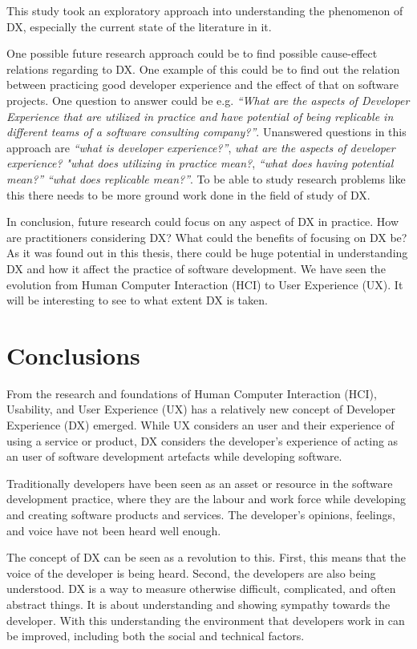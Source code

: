 \documentclass[english, 12pt, a4paper, sci, utf8, a-1b, online]{aaltothesis}
\begin{document}
This study took an exploratory approach into understanding the phenomenon of DX, especially the current state of the literature in it.

One possible future research approach could be to find possible cause-effect relations regarding to DX. One example of this could be to find out the relation between practicing good developer experience and the effect of that on software projects. One question to answer could be e.g. \textit{``What are the aspects of Developer Experience that are utilized in practice and have potential of being replicable in different teams of a software consulting company?''}. Unanswered questions in this approach are \textit{``what is developer experience?''}, \textit{what are the aspects of developer experience?} \textit{"what does utilizing in practice mean?}, \textit{``what does having potential mean?''} \textit{``what does replicable mean?''}. To be able to study research problems like this there needs to be more ground work done in the field of study of DX.

In conclusion, future research could focus on any aspect of DX in practice. How are practitioners considering DX? What could the benefits of focusing on DX be? As it was found out in this thesis, there could be huge potential in understanding DX and how it affect the practice of software development. We have seen the evolution from Human Computer Interaction (HCI) to User Experience (UX). It will be interesting to see to what extent DX is taken.

\clearpage
\section{Conclusions} \label{section:conclusions}

From the research and foundations of Human Computer Interaction (HCI), Usability, and User Experience (UX) has a relatively new concept of Developer Experience (DX) emerged. While UX considers an user and their experience of using a service or product, DX considers the developer's experience of acting as an user of software development artefacts while developing software.

Traditionally developers have been seen as an asset or resource in the software development practice, where they are the labour and work force while developing and creating software products and services. The developer's opinions, feelings, and voice have not been heard well enough.

The concept of DX can be seen as a revolution to this. First, this means that the voice of the developer is being heard. Second, the developers are also being understood. DX is a way to measure otherwise difficult, complicated, and often abstract things. It is about understanding and showing sympathy towards the developer. With this understanding the environment that developers work in can be improved, including both the social and technical factors.
\end{document}
